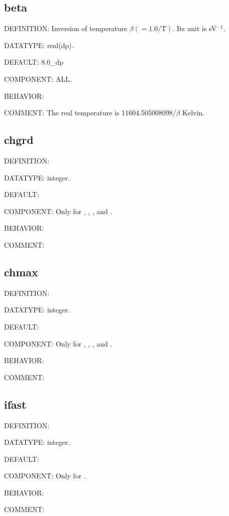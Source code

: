 \subsection{beta}
{\color{red}DEFINITION:} Inversion of temperature $\beta (= 1.0 / \text{T})$. Its unit is eV$^{-1}$.

{\color{green}DATATYPE:} real(dp).

{\color{blue}DEFAULT:} 8.0\_dp

{\color{brown}COMPONENT:} ALL.

{\color{purple}BEHAVIOR:}

{\color{olive}COMMENT:} The real temperature is 11604.505008098/$\beta$ Kelvin.

\subsection{chgrd}
{\color{red}DEFINITION:}

{\color{green}DATATYPE:} integer.

{\color{blue}DEFAULT:}

{\color{brown}COMPONENT:} Only for {\gardenia}, {\narcissus}, {\lavender}, and {\manjushaka}.

{\color{purple}BEHAVIOR:}

{\color{olive}COMMENT:}

\subsection{chmax}
{\color{red}DEFINITION:}

{\color{green}DATATYPE:} integer.

{\color{blue}DEFAULT:}

{\color{brown}COMPONENT:} Only for {\gardenia}, {\narcissus}, {\lavender}, and {\manjushaka}.

{\color{purple}BEHAVIOR:}

{\color{olive}COMMENT:}

\subsection{ifast}
{\color{red}DEFINITION:}

{\color{green}DATATYPE:} integer.

{\color{blue}DEFAULT:}

{\color{brown}COMPONENT:} Only for {\manjushaka}.

{\color{purple}BEHAVIOR:}

{\color{olive}COMMENT:}

